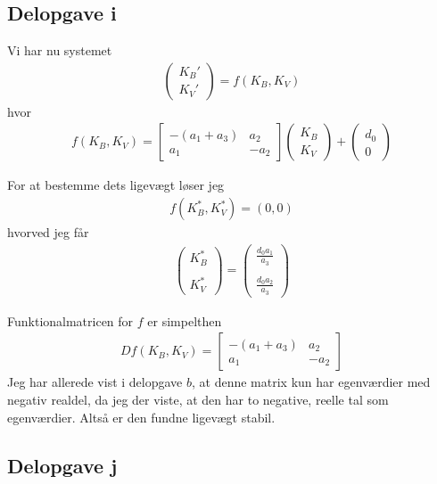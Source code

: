 \documentclass[12pt]{article}
\begin{document}
\subsection{Delopgave i}

Vi har nu systemet
\begin{align}
\begin{pmatrix}
K_B' \\ K_V'
\end{pmatrix} = f(K_B, K_V)
\end{align}
hvor 
\begin{align}
f(K_B, K_V) = \begin{bmatrix}
-(a_1 + a_3) & a_2 \\ 
a_1 & -a_2
\end{bmatrix}\begin{pmatrix}
K_B \\ K_V
\end{pmatrix} + \begin{pmatrix}
d_0 \\ 0
\end{pmatrix}
\end{align}

For at bestemme dets ligevægt løser jeg
\begin{align}
f(K_B^*, K_V^*) = (0,0)
\end{align}
hvorved jeg får
\begin{align}
\begin{pmatrix}
K_B^* \\ \\ K_V^*
\end{pmatrix} = \begin{pmatrix}
\frac{d_0a_1}{a_3} \\ \\ 
\frac{d_0a_2}{a_3}
\end{pmatrix}
\end{align}

Funktionalmatricen for $f$ er simpelthen
\begin{align}
Df(K_B, K_V) = \begin{bmatrix}
-(a_1 + a_3) & a_2 \\ 
a_1 & -a_2
\end{bmatrix}
\end{align}
Jeg har allerede vist i delopgave $b$, at denne matrix kun har egenværdier med negativ realdel, da jeg der viste, at den har to negative, reelle tal som egenværdier. Altså er den fundne ligevægt stabil.

\subsection{Delopgave j}
\end{document}
